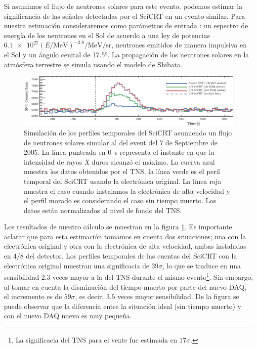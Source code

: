 Si asumimos el flujo de neutrones solares para este evento, podemos estimar la significancia de las señales detectadas por el SciCRT en un evento similar. Para nuestra estimación consideraremos como parámetros de entrada \cite{ynagai14}: un espectro de energía de los neutrones en el Sol de acuerdo a una ley de potencias
$\num{6.1e27}\left(E/\si{\mega\electronvolt}\right)^{-3.8}\si{\per\mega\electronvolt\per\steradian}$, neutrones emitidos de manera impulsiva en el Sol y un ángulo cenital de \ang{17.5}. La propagación de los neutrones solares en la atmósfera terrestre se simula usando el modelo de Shibata.

\begin{figure}
\centering
  \includegraphics[width=\textwidth]{scicrt-sim.pdf}
  \caption{Simulación de los perfiles temporales del SciCRT asumiendo un flujo de neutrones solares simular al del event del \num{7} de Septiembre de \num{2005}. La línea punteada en \SI{0}{\second} representa el instante en que la intensidad de rayos \emph{X} duros alcanzó el máximo. La cuerva azul muestra los datos obtenidos por el TNS, la línea verde es el peril temporal del SciCRT usando la electrónica original. La línea roja muestra el caso cuando instalamos la electrónica de alta velocidad y el perfil morado es considerando el caso sin tiempo muerto. Los datos están normalizados al nivel de fondo del TNS.}
  \label{fig:solar-sim}
\end{figure}

Los resultados de nuestro cálculo se muestran en la figura \ref{fig:solar-sim}. Es importante aclarar que para esta estimación tomamos en cuenta dos situaciones; una con la electrónica original y otra con la electrónica de alta velocidad, ambas instaladas en $4/8$ del detector. Los perfiles temporales de las cuentas del SciCRT con la electrónica original muestran una significacia de $39\sigma$, lo que se traduce en una sensibilidad $2.3$ veces mayor a la del TNS durante el mismo evento\footnote{La significacia del TNS para el vente fue estimada en $17\sigma$.}. Sin embargo, al tomar en cuenta la disminución del tiempo muerto por parte del nuevo DAQ, el incremento es de $59\sigma$, es decir, $3.5$ veces mayor sensibilidad. De la figura se puede observar que la diferencia entre la situación ideal (sin tiempo muerto) y con el nuevo DAQ nuevo es muy pequeña.

